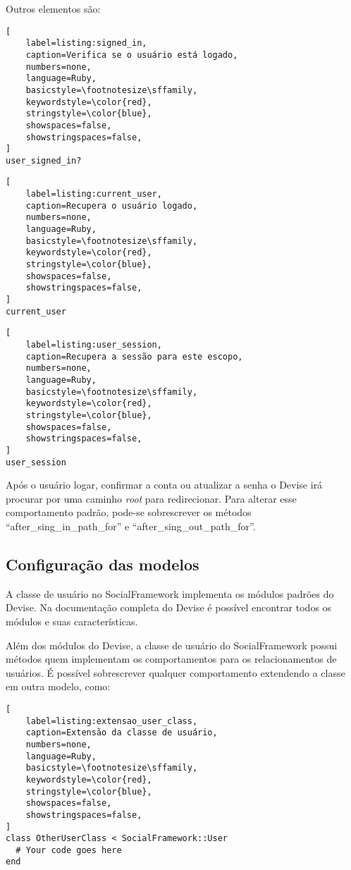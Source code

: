 Outros elementos são:

\begin{lstlisting}[
    label=listing:signed_in,
    caption=Verifica se o usuário está logado,
    numbers=none,
    language=Ruby,
    basicstyle=\footnotesize\sffamily,
    keywordstyle=\color{red},
    stringstyle=\color{blue},
    showspaces=false,
    showstringspaces=false,
]
user_signed_in?
\end{lstlisting}

\begin{lstlisting}[
    label=listing:current_user,
    caption=Recupera o usuário logado,
    numbers=none,
    language=Ruby,
    basicstyle=\footnotesize\sffamily,
    keywordstyle=\color{red},
    stringstyle=\color{blue},
    showspaces=false,
    showstringspaces=false,
]
current_user
\end{lstlisting}

\begin{lstlisting}[
    label=listing:user_session,
    caption=Recupera a sessão para este escopo,
    numbers=none,
    language=Ruby,
    basicstyle=\footnotesize\sffamily,
    keywordstyle=\color{red},
    stringstyle=\color{blue},
    showspaces=false,
    showstringspaces=false,
]
user_session
\end{lstlisting}

Após o usuário logar, confirmar a conta ou atualizar a senha o Devise irá procurar por uma caminho \textit{root} para redirecionar. Para alterar esse comportamento padrão, pode-se sobrescrever os métodos ``after\_sing\_in\_path\_for'' e ``after\_sing\_out\_path\_for''.

\subsection{Configuração das modelos}

A classe de usuário no SocialFramework implementa os módulos padrões do Devise. Na documentação completa do Devise é possível encontrar todos os módulos e suas características.

Além dos módulos do Devise, a classe de usuário do SocialFramework possui métodos quem implementam os comportamentos para os relacionamentos de usuários. É possível sobrescrever qualquer comportamento extendendo a classe em outra modelo, como:

\begin{lstlisting}[
    label=listing:extensao_user_class,
    caption=Extensão da classe de usuário,
    numbers=none,
    language=Ruby,
    basicstyle=\footnotesize\sffamily,
    keywordstyle=\color{red},
    stringstyle=\color{blue},
    showspaces=false,
    showstringspaces=false,
]
class OtherUserClass < SocialFramework::User
  # Your code goes here
end
\end{lstlisting}

